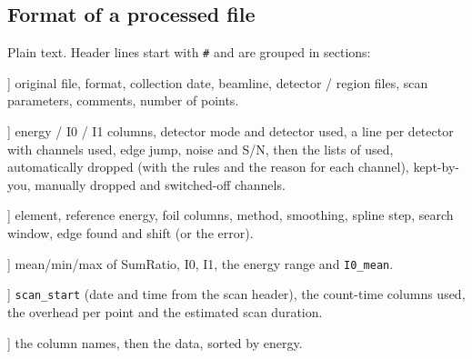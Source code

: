 \documentclass[11pt,a4paper]{article}
\begin{document}
\subsection{Format of a processed file}
Plain text. Header lines start with \texttt{\#} and are grouped in sections:
\begin{description}[font=\ttfamily]
  \item[[source]] original file, format, collection date, beamline, detector / region files, scan
        parameters, comments, number of points.
  \item[[channels]] energy / I0 / I1 columns, detector mode and detector used, a line per detector with
        channels used, edge jump, noise and S/N, then the lists of used, automatically dropped (with the
        rules and the reason for each channel), kept-by-you, manually dropped and switched-off channels.
  \item[[energy calibration]] element, reference energy, foil columns, method, smoothing, spline step,
        search window, edge found and shift (or the error).
  \item[[statistics]] mean/min/max of SumRatio, I0, I1, the energy range and \texttt{I0\_mean}.
  \item[[time]] \texttt{scan\_start} (date and time from the scan header), the count-time columns used,
        the overhead per point and the estimated scan duration.
  \item[[data]] the column names, then the data, sorted by energy.
\end{description}
\end{document}
